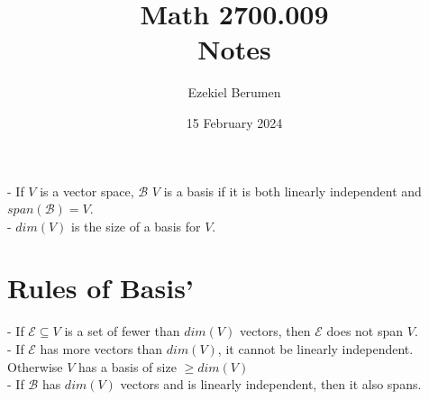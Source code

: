 \documentclass{report}
\title{\Huge{Math 2700.009}\\Notes}
\author{\huge{Ezekiel Berumen}}
\date{15 February 2024}
\begin{document}
\maketitle
\newpage

\begin{note}
- If $V$ is a vector space,  $\mathcal{B}$ $V$ is a basis if it is both linearly independent and $span(\mathcal{B}) = V$. \\
- $dim(V)$ is the size of a basis for $V$. \\
\end{note}


\section{Rules of Basis'}
- If $\mathcal{E} \subseteq V$ is a set of fewer than $dim(V)$ vectors, then $\mathcal{E}$ does not span $V$.  \\
- If $\mathcal{E}$ has more vectors than $dim(V)$, it cannot be linearly independent.  Otherwise $V$ has a basis of size $\ge dim(V)$ \\
- If $\mathcal{B}$ has $dim(V)$ vectors and is linearly independent, then it also spans.

\end{document}
